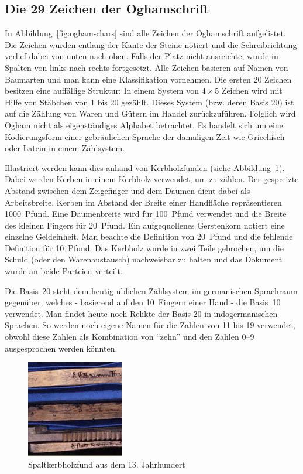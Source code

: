 \documentclass[a4paper]{scrartcl}
\begin{document}
\subsection{Die 29 Zeichen der Oghamschrift}
%
In Abbildung~\ref{fig:ogham-chars} sind alle Zeichen der Oghamschrift aufgelistet. Die Zeichen wurden entlang der Kante der Steine notiert und die Schreibrichtung verlief dabei von unten nach oben. Falls der Platz nicht ausreichte, wurde in Spalten von links nach rechts fortgesetzt. Alle Zeichen basieren auf Namen von Baumarten und man kann eine Klassifikation vornehmen. Die ersten 20 Zeichen besitzen eine auffällige Struktur: In einem System von $4\times 5$ Zeichen wird mit Hilfe von Stäbchen von 1 bis 20 gezählt. Dieses System (bzw. deren Basis 20) ist auf die Zählung von Waren und Gütern im Handel zurückzuführen. Folglich wird Ogham nicht als eigenständiges Alphabet betrachtet. Es handelt sich um eine Kodierungsform einer gebräulichen Sprache der damaligen Zeit wie Griechisch oder Latein in einem Zählsystem.

Illustriert werden kann dies anhand von Kerbholzfunden (siehe Abbildung~\ref{fig:tally-stick}). Dabei werden Kerben in einem Kerbholz verwendet, um zu zählen. Der gespreizte Abstand zwischen dem Zeigefinger und dem Daumen dient dabei als Arbeitsbreite. Kerben im Abstand der Breite einer Handfläche repräsentieren 1000~Pfund. Eine Daumenbreite wird für 100~Pfund verwendet und die Breite des kleinen Fingers für 20~Pfund. Ein aufgequollenes Gerstenkorn notiert eine einzelne Geldeinheit. Man beachte die Definition von 20~Pfund und die fehlende Definition für 10~Pfund. Das Kerbholz wurde in zwei Teile gebrochen, um die Schuld (oder den Warenaustausch) nachweisbar zu halten und das \glqq Dokument\grqq{} wurde an beide Parteien verteilt.

Die Basis~20 steht dem heutig üblichen Zählsystem im germanischen Sprachraum gegenüber, welches - basierend auf den 10~Fingern einer Hand - die Basis~10 verwendet. Man findet heute noch Relikte der Basis 20 in indogermanischen Sprachen. So werden noch eigene Namen für die Zahlen von 11 bis 19 verwendet, obwohl diese Zahlen als Kombination von \enquote{zehn} und den Zahlen 0--9 ausgesprochen werden könnten. 

\begin{figure}[t]
  \begin{center}
    \includegraphics[width=120pt,height=120pt]{images/tally_stick.jpg}
    \caption{Spaltkerbholzfund aus dem 13. Jahrhundert~\cite{tally-sticks}}
    \label{fig:tally-stick}
  \end{center}
\end{figure}
\end{document}
